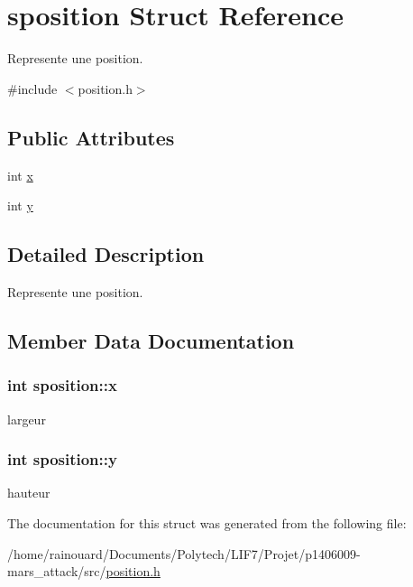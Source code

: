 \hypertarget{structsposition}{}\section{sposition Struct Reference}
\label{structsposition}


Represente une position.  




{\ttfamily \#include $<$position.\+h$>$}

\subsection*{Public Attributes}
\begin{DoxyCompactItemize}
\item 
int \hyperlink{structsposition_a3bbcebde3f8e92773bef42f15985895f}{x}
\item 
int \hyperlink{structsposition_a62799f72b5e6bf346efe21e45e6e4858}{y}
\end{DoxyCompactItemize}


\subsection{Detailed Description}
Represente une position. 

\subsection{Member Data Documentation}
\subsubsection[{\texorpdfstring{x}{x}}]{\setlength{\rightskip}{0pt plus 5cm}int sposition\+::x}\hypertarget{structsposition_a3bbcebde3f8e92773bef42f15985895f}{}\label{structsposition_a3bbcebde3f8e92773bef42f15985895f}
largeur 
\subsubsection[{\texorpdfstring{y}{y}}]{\setlength{\rightskip}{0pt plus 5cm}int sposition\+::y}\hypertarget{structsposition_a62799f72b5e6bf346efe21e45e6e4858}{}\label{structsposition_a62799f72b5e6bf346efe21e45e6e4858}
hauteur 

The documentation for this struct was generated from the following file\+:\begin{DoxyCompactItemize}
\item 
/home/rainouard/\+Documents/\+Polytech/\+L\+I\+F7/\+Projet/p1406009-\/mars\+\_\+attack/src/\hyperlink{position_8h}{position.\+h}\end{DoxyCompactItemize}
